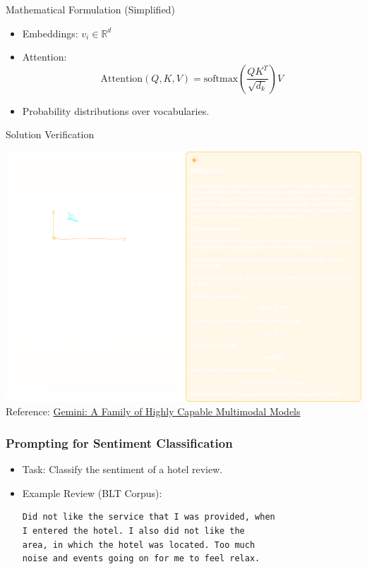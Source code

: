 \begin{frame}{Mathematical Formulation (Simplified)}
  \begin{itemize}
    \item Embeddings: $v_i \in \mathbb{R}^d$
    \item Attention:
      \begin{equation*}
        \text{Attention}(Q, K, V) = \text{softmax}\left(\frac{QK^T}{\sqrt{d_k}}\right)V
      \end{equation*}
    \item Probability distributions over vocabularies.
  \end{itemize}
\end{frame}
\begin{frame}{Solution Verification}
\begin{center}
\includegraphics[width=0.7\linewidth]{Images/VerificationOfSolutionPrompt}
\\
Reference: \href{https://storage.googleapis.com/deepmind-media/gemini/gemini_1_report.pdf}{Gemini: A Family of Highly Capable
Multimodal Models}
\end{center}

\end{frame}
\begin{frame}[fragile]
    \frametitle{Prompting for Sentiment Classification}
    \begin{itemize}
        \item Task: Classify the sentiment of a hotel review.
        \item Example Review (BLT Corpus):
        \begin{verbatim}
Did not like the service that I was provided, when
I entered the hotel. I also did not like the
area, in which the hotel was located. Too much
noise and events going on for me to feel relax.

        \end{verbatim}
    \end{itemize}
\end{frame}

